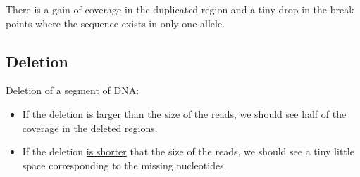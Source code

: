 There is a gain of coverage in the duplicated region and a tiny drop in the
break points where the sequence exists in only one allele.


\hypertarget{deletion}{%
\subsection{Deletion}\label{deletion}}


Deletion of a segment of DNA:

\begin{itemize}
  \item If the deletion \underline{is larger} than the size of the reads, we
  should see half of the coverage in the deleted regions.
  \item If the deletion \underline{is shorter} that the size of the reads, we
  should see a tiny little space corresponding to the missing nucleotides.

\end{itemize}



